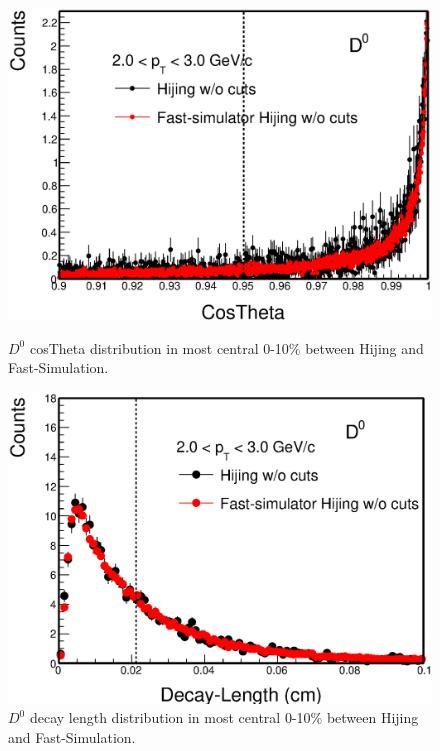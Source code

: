 \documentclass[a4paper]{article}
\begin{document}
\begin{figure}[htbp]
\begin{minipage}[htbp]{0.52\linewidth}
\centering
\includegraphics[width=1.0\textwidth,angle=0]{fig/HijingcosTheta.eps}
\caption{ $D^0$ cosTheta distribution in most central 0-10\% between Hijing and Fast-Simulation.\label{Hijingpointingangle}}
\end{minipage}
\hfill
\begin{minipage}[htbp]{0.52\linewidth}
\centering
\includegraphics[width=1.0\textwidth,angle=0]{fig/HijingDecayL.eps} 
\caption{ $D^0$ decay length distribution in most central 0-10\% between Hijing and Fast-Simulation.\label{HijingDecayL}}
\end{minipage}
\end{figure}
\end{document}
